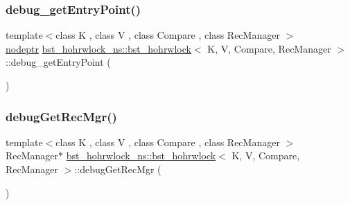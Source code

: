 \mbox{\label{classbst__hohrwlock__ns_1_1bst__hohrwlock_ab9d0773edc32cc5ca013f5088e923e8c}} 
\subsubsection{\texorpdfstring{debug\+\_\+get\+Entry\+Point()}{debug\_getEntryPoint()}}
{\footnotesize\ttfamily template$<$class K , class V , class Compare , class Rec\+Manager $>$ \\
\hyperlink{bst__rwlock__impl_8h_a04158d2a20768fe447133ff555823b05}{nodeptr} \hyperlink{classbst__hohrwlock__ns_1_1bst__hohrwlock}{bst\+\_\+hohrwlock\+\_\+ns\+::bst\+\_\+hohrwlock}$<$ K, V, Compare, Rec\+Manager $>$\+::debug\+\_\+get\+Entry\+Point (\begin{DoxyParamCaption}{ }\end{DoxyParamCaption})\hspace{0.3cm}{\ttfamily [inline]}}

\mbox{\label{classbst__hohrwlock__ns_1_1bst__hohrwlock_a990501110597111d6aafc3b7a48a924d}} 
\subsubsection{\texorpdfstring{debug\+Get\+Rec\+Mgr()}{debugGetRecMgr()}}
{\footnotesize\ttfamily template$<$class K , class V , class Compare , class Rec\+Manager $>$ \\
Rec\+Manager$\ast$ \hyperlink{classbst__hohrwlock__ns_1_1bst__hohrwlock}{bst\+\_\+hohrwlock\+\_\+ns\+::bst\+\_\+hohrwlock}$<$ K, V, Compare, Rec\+Manager $>$\+::debug\+Get\+Rec\+Mgr (\begin{DoxyParamCaption}{ }\end{DoxyParamCaption})\hspace{0.3cm}{\ttfamily [inline]}}


